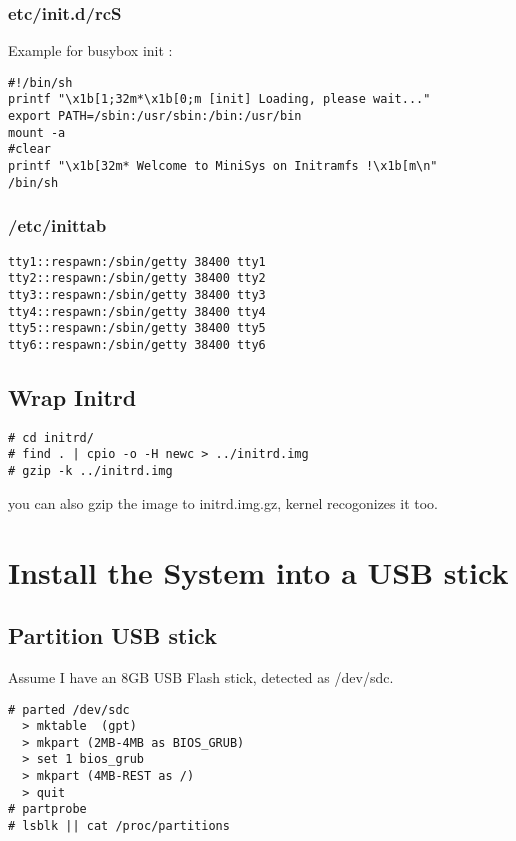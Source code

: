 \documentclass[10pt,a4paper]{article}
\begin{document}
\subsubsection{etc/init.d/rcS}
Example for busybox init :
\begin{framed}\begin{verbatim}
#!/bin/sh
printf "\x1b[1;32m*\x1b[0;m [init] Loading, please wait..."
export PATH=/sbin:/usr/sbin:/bin:/usr/bin
mount -a
#clear
printf "\x1b[32m* Welcome to MiniSys on Initramfs !\x1b[m\n"
/bin/sh
\end{verbatim}\end{framed}

\subsubsection{/etc/inittab}
\begin{verbatim}
tty1::respawn:/sbin/getty 38400 tty1
tty2::respawn:/sbin/getty 38400 tty2
tty3::respawn:/sbin/getty 38400 tty3
tty4::respawn:/sbin/getty 38400 tty4
tty5::respawn:/sbin/getty 38400 tty5
tty6::respawn:/sbin/getty 38400 tty6
\end{verbatim}

\subsection{Wrap Initrd}
\begin{framed}\begin{verbatim}
# cd initrd/
# find . | cpio -o -H newc > ../initrd.img
# gzip -k ../initrd.img
\end{verbatim}\end{framed}
you can also gzip the image to initrd.img.gz, kernel recogonizes it too.

\section{Install the System into a USB stick}
\subsection{Partition USB stick}
Assume I have an 8GB USB Flash stick, detected as /dev/sdc.
\begin{framed}\begin{verbatim}
# parted /dev/sdc
  > mktable  (gpt)
  > mkpart (2MB-4MB as BIOS_GRUB)
  > set 1 bios_grub
  > mkpart (4MB-REST as /)
  > quit
# partprobe
# lsblk || cat /proc/partitions
\end{verbatim}\end{framed}
\end{document}
